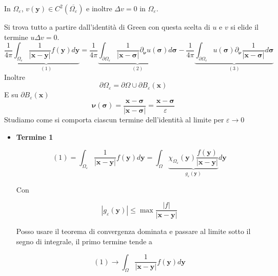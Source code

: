 \documentclass[10pt,a4paper,twoside,openright]{book}
\newcommand{\x}{\mathbf{x}}
\newcommand{\y}{\mathbf{y}}
\begin{document}
\begin{dimostrazione}
	In $\displaystyle \Omega _{\varepsilon }$, $\displaystyle v(\y) \in C^{2}\left(\overline{\Omega _{\varepsilon }}\right)$ e inoltre $\displaystyle \Delta v=0$ in $\displaystyle \Omega _{\varepsilon }$.

	Si trova tutto a partire dall'identità di Green con questa scelta di $\displaystyle u$ e $\displaystyle v$ si elide il termine $\displaystyle u\Delta v=0$.
	\begin{equation*}
	\frac{1}{4\pi }\underbrace{\int _{\Omega _{\varepsilon }}\frac{1}{| \x -\y| } f(\y) d\y}_{( 1)} =\frac{1}{4\pi }\underbrace{\int _{\partial \Omega _{\varepsilon }}\frac{1}{| \x -\bm{\sigma }| } \partial _{\bm{\nu}} u(\bm{\sigma }) d\bm{\sigma }}_{( 2)} -\frac{1}{4\pi }\underbrace{\int _{\partial \Omega _{\varepsilon }} u(\bm{\sigma }) \partial _{\bm{\nu}}\frac{1}{| \x -\bm{\sigma }| } d\bm{\sigma }}_{( 3)}
	\end{equation*}
	Inoltre
	\begin{equation*}
	\partial \Omega _{\varepsilon } =\partial \Omega \cup \partial B_{\varepsilon }(\x)
	\end{equation*}
	E su $\displaystyle \partial B_{\varepsilon }(\x)$
	\begin{equation*}
	\bm{\nu}(\bm{\sigma }) =\frac{\x -\bm{\sigma }}{| \x -\bm{\sigma }| } =\frac{\x -\bm{\sigma }}{\varepsilon }
	\end{equation*}
	Studiamo come si comporta ciascun termine dell'identità al limite per $\displaystyle \varepsilon \rightarrow 0$
	\begin{itemize}
	\item \textbf{Termine 1}

	\begin{equation*}
	( 1) =\int _{\Omega _{\varepsilon }}\frac{1}{| \x -\y| } f(\y) d\y =\int _{\Omega }\underbrace{\chi _{\Omega _{\varepsilon }}(\y)\frac{f(\y)}{| \x -\y| }}_{g_{\varepsilon }(\y)} d\y
	\end{equation*}

	Con 

	\begin{equation*}
	| g_{\varepsilon }(\y)| \leqslant \max\frac{| f| }{| \x -\y| }
	\end{equation*}

	Posso usare il teorema di convergenza dominata e passare al limite sotto il segno di integrale, il primo termine tende a

	\begin{equation*}
	( 1)\rightarrow \int _{\Omega }\frac{1}{| \x -\y| } f(\y) d\y
	\end{equation*}


\end{itemize}
\end{dimostrazione}
\end{document}
